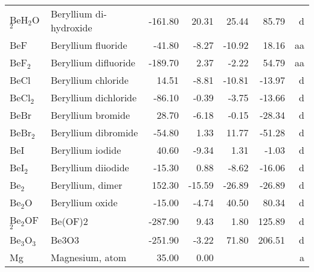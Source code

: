 \begin{table}
\begin{center}
\begin{tabular}{llrrrrr}
 BeH$_2$O$_2$      & Beryllium di-hydroxide          &  -161.80    &    20.31  &    25.44  &    85.79  &      d\\
 BeF         & Beryllium fluoride              &   -41.80    &    -8.27  &   -10.92  &    18.16  &     aa\\
 BeF$_2$        & Beryllium difluoride            &  -189.70    &     2.37  &    -2.22  &    54.79  &     aa\\
 BeCl        & Beryllium chloride              &    14.51    &    -8.81  &   -10.81  &   -13.97  &      d\\
 BeCl$_2$       & Beryllium dichloride            &   -86.10    &    -0.39  &    -3.75  &   -13.66  &      d\\
 BeBr        & Beryllium bromide               &    28.70    &    -6.18  &    -0.15  &   -28.34  &      d\\
 BeBr$_2$       & Beryllium dibromide             &   -54.80    &     1.33  &    11.77  &   -51.28  &      d\\
 BeI         & Beryllium iodide                &    40.60    &    -9.34  &     1.31  &    -1.03  &      d\\
 BeI$_2$        & Beryllium diiodide              &   -15.30    &     0.88  &    -8.62  &   -16.06  &      d\\
 Be$_2$         & Beryllium, dimer                &   152.30    &   -15.59  &   -26.89  &   -26.89  &      d\\
 Be$_2$O        & Beryllium oxide                 &   -15.00    &    -4.74  &    40.50  &    80.34  &      d\\
 Be$_2$OF$_2$      & Be(OF)2                         &  -287.90    &     9.43  &     1.80  &   125.89  &      d\\
 Be$_3$O$_3$       & Be3O3                           &  -251.90    &    -3.22  &    71.80  &   206.51  &      d\\
 Mg          & Magnesium, atom                 &    35.00    &     0.00  &  &  &      a\\
\hline
\end{tabular}
\end{center}
\end{table}
\clearpage

